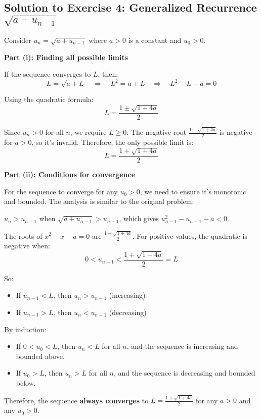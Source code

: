 \documentclass[12pt,a4paper]{article}
\theoremstyle{definition}
\begin{document}
\subsection{Solution to Exercise 4: Generalized Recurrence $\sqrt{a + u_{n-1}}$}

Consider $u_n = \sqrt{a + u_{n-1}}$ where $a > 0$ is a constant and $u_0 > 0$.

\textbf{Part (i): Finding all possible limits}

If the sequence converges to $L$, then:
\[
L = \sqrt{a + L} \quad \Rightarrow \quad L^2 = a + L \quad \Rightarrow \quad L^2 - L - a = 0
\]

Using the quadratic formula:
\[
L = \frac{1 \pm \sqrt{1 + 4a}}{2}
\]

Since $u_n > 0$ for all $n$, we require $L \geq 0$. The negative root $\frac{1 - \sqrt{1 + 4a}}{2}$ is negative for $a > 0$, so it's invalid. Therefore, the only possible limit is:
\[
L = \frac{1 + \sqrt{1 + 4a}}{2}
\]

\textbf{Part (ii): Conditions for convergence}

For the sequence to converge for any $u_0 > 0$, we need to ensure it's monotonic and bounded. The analysis is similar to the original problem:

$u_n > u_{n-1}$ when $\sqrt{a + u_{n-1}} > u_{n-1}$, which gives $u_{n-1}^2 - u_{n-1} - a < 0$.

The roots of $x^2 - x - a = 0$ are $\frac{1 \pm \sqrt{1 + 4a}}{2}$. For positive values, the quadratic is negative when:
\[
0 < u_{n-1} < \frac{1 + \sqrt{1 + 4a}}{2} = L
\]

So:
\begin{itemize}
    \item If $u_{n-1} < L$, then $u_n > u_{n-1}$ (increasing)
    \item If $u_{n-1} > L$, then $u_n < u_{n-1}$ (decreasing)
\end{itemize}

By induction:
\begin{itemize}
    \item If $0 < u_0 < L$, then $u_n < L$ for all $n$, and the sequence is increasing and bounded above.
    \item If $u_0 > L$, then $u_n > L$ for all $n$, and the sequence is decreasing and bounded below.
\end{itemize}

Therefore, the sequence \textbf{always converges} to $L = \frac{1 + \sqrt{1 + 4a}}{2}$ for any $a > 0$ and any $u_0 > 0$.
\end{document}
